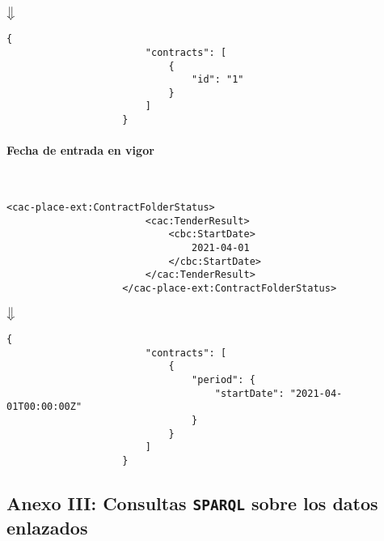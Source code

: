                 \begin{center}
                    $\big\Downarrow$
                \end{center}
\newpage
                \begin{lstlisting}[language=lJSON]
                    {
                        "contracts": [
                            {
                                "id": "1"
                            }
                        ]
                    }
                \end{lstlisting}
                
            \paragraph{Fecha de entrada en vigor} \mbox{}\\
                \begin{lstlisting}[language=lXML]
                    <cac-place-ext:ContractFolderStatus>
                        <cac:TenderResult>
                            <cbc:StartDate>
                                2021-04-01
                            </cbc:StartDate>
                        </cac:TenderResult>
                    </cac-place-ext:ContractFolderStatus>
                \end{lstlisting}
                
                \begin{center}
                    $\big\Downarrow$
                \end{center}
                
                \begin{lstlisting}[language=lJSON]
                    {
                        "contracts": [
                            {
                                "period": {
                                    "startDate": "2021-04-01T00:00:00Z"
                                }
                            }
                        ]
                    }
                \end{lstlisting}

\newpage

    \subsection{Anexo III: Consultas \texttt{SPARQL} sobre los datos enlazados} \label{annex:sparql}
